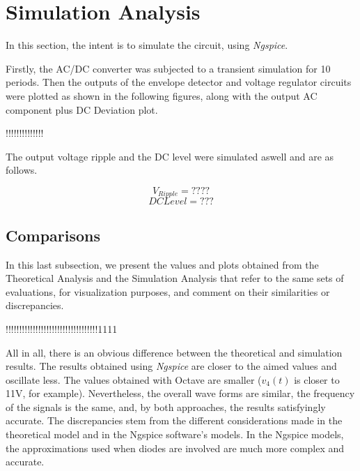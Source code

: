 \section{Simulation Analysis}
\label{sec:simulation}

In this section, the intent is to simulate the circuit, using \textit{Ngspice}.

Firstly, the AC/DC converter was subjected to a transient simulation for 10 periods. Then the outputs of the envelope detector and voltage regulator circuits were plotted as shown in the following figures, along with the output AC component plus DC Deviation plot.

!!!!!!!!!!!!!!


The output voltage ripple and the DC level were simulated aswell and are as follows.

\begin{equation}
    V_{Ripple} = ????
\end{equation}
\begin{equation}
    DC Level = ???
\end{equation}


\subsection{Comparisons}
\label{subsec:compare}

In this last subsection, we present the values and plots obtained from the Theoretical Analysis and the Simulation Analysis that refer to the same sets of evaluations, for visualization purposes, and comment on their similarities or discrepancies.

!!!!!!!!!!!!!!!!!!!!!!!!!!!!!!!!!!1111


All in all, there is an obvious difference between the theoretical and simulation results. The results obtained using \textit{Ngspice} are closer to the aimed values and oscillate less. The values obtained with Octave are smaller ($v_4(t)$ is closer to 11V, for example). Nevertheless, the overall wave forms are similar, the frequency of the signals is the same, and, by both approaches, the results satisfyingly accurate. 
The discrepancies stem from the different considerations made in the theoretical model and in the Ngspice software's models. In the Ngspice models, the approximations used when diodes are involved are much more complex and accurate.
